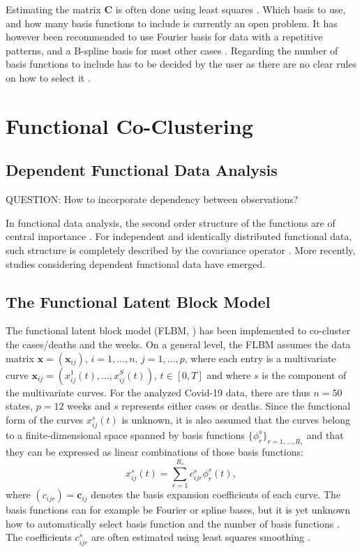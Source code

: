 \documentclass[12pt,a4paper]{article}
\begin{document}
Estimating the matrix $\mathbf{C}$ is often done using least squares \cite{ramsay2002functional}. Which basis to use, and how many basis functions to include is currently an open problem. It has however been recommended to use Fourier basis for data with a repetitive patterns, and a B-spline basis for most other cases \cite{schmutz2020clustering}. Regarding the number of basis functions to include has to be decided by the user as there are no clear rules on how to select it \cite{JacquesPreda}. 
 
\section{Functional Co-Clustering}

\subsection{Dependent Functional Data Analysis}
QUESTION: How to incorporate dependency between observations?

In functional data analysis, the second order structure of the functions are of central importance \cite{panaretos2013fourier}. For independent and identically distributed functional data, such structure is completely described by the covariance operator \cite{grenander1981abstract}. More recently, studies considering dependent functional data have emerged. 


\subsection{The Functional Latent Block Model}

The functional latent block model (FLBM, \cite{Bouveyron}) has been implemented to co-cluster the cases/deaths and the weeks. On a general level, the FLBM assumes the data matrix $\mathbf{x} = (\mathbf{x}_{ij})$, $i = 1,..., n$, $j = 1,..., p$, where each entry is a multivariate curve $\mathbf{x}_{ij} = (x_{ij}^1(t), \ldots, x_{ij}^S(t))$, $t \in [0, T]$ and where $s$ is the component of the multivariate curves. For the analyzed Covid-19 data, there are thus $n = 50$ states, $p = 12$ weeks and $s$ represents either cases or deaths. Since the functional form of the curves  $x_{ij}^s(t)$ is unknown, it is also assumed that the curves belong to a finite-dimensional space spanned by basis functions $\{\phi_r^s\}_{r=1, \dots, R_s}$ and that they can be expressed as linear combinations of those basis functions:
%
\begin{equation}
	x_{ij}^s(t) = \sum_{r=1}^{R_s} c^s_{ijr} \phi^s_r(t),
\end{equation}  
%
where $(c_{ijr}) = \mathbf{c}_{ij}$ denotes the basis expansion coefficients of each curve. The basis functions can for example be Fourier or spline bases, but it is yet unknown how to automatically select basis function and the number of basis functions \cite{Jacques}. The coefficients $c^s_{ijr}$ are often estimated using least squares smoothing \cite{Ramsay}.
\end{document}
